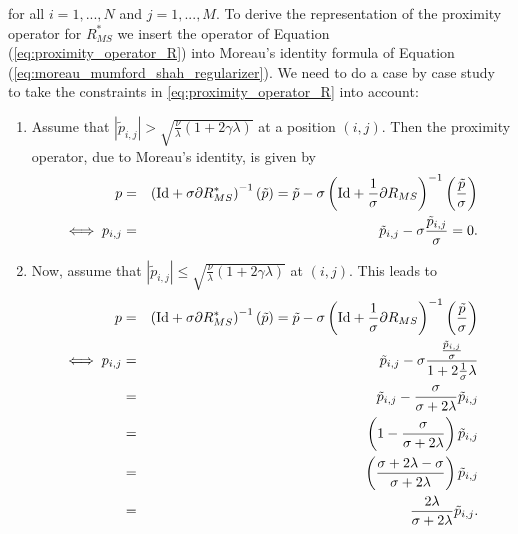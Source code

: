 \documentclass[abstracton]{scrreprt}
\begin{document}
            for all $i = 1, ..., N$ and $j = 1, ..., M$. To derive the representation of the proximity operator for $R_{MS}^{\ast}$ we insert the operator of Equation (\ref{eq:proximity_operator_R}) into Moreau's identity formula of Equation (\ref{eq:moreau_mumford_shah_regularizer}). We need to do a case by case study to take the constraints in \ref{eq:proximity_operator_R} into account:
            \begin{enumerate}
                \item Assume that $|\tilde{p}_{i,j}| > \sqrt{\frac{\nu}{\lambda}(1 + 2\gamma\lambda)}$ at a position $(i,j)$. Then the proximity operator, due to Moreau's identity, is given by
                    \begin{eqnarray}
                        p &=& \left( \textnormal{Id} + \sigma \partial R_{MS}^{\ast} \right)^{-1}(\tilde{p}) = \tilde{p} - \sigma \left( \textnormal{Id} + \frac{1}{\sigma} \partial R_{MS} \right)^{-1} \left(\frac{\tilde{p}}{\sigma} \right) \notag \\
                        \iff p_{i,j} &=& \tilde{p}_{i,j} - \sigma \frac{\tilde{p}_{i,j}}{\sigma} = 0. \notag
                    \end{eqnarray}
                \item Now, assume that $|\tilde{p}_{i,j}| \le \sqrt{\frac{\nu}{\lambda}(1 + 2\gamma\lambda)}$ at $(i,j)$. This leads to
                    \begin{eqnarray}
                        p &=& \left( \textnormal{Id} + \sigma \partial R_{MS}^{\ast} \right)^{-1}(\tilde{p}) = \tilde{p} - \sigma \left( \textnormal{Id} + \frac{1}{\sigma} \partial R_{MS} \right)^{-1} \left(\frac{\tilde{p}}{\sigma} \right) \notag \\
                        \iff p_{i,j} &=& \tilde{p}_{i,j} - \sigma \frac{\frac{\tilde{p}_{i,j}}{\sigma}}{1 + 2\frac{1}{\sigma}\lambda} \notag \\
                        &=& \tilde{p}_{i,j} - \frac{\sigma}{\sigma + 2\lambda}\tilde{p}_{i,j} \notag \\
                        &=& \left(1 - \frac{\sigma}{\sigma + 2\lambda}\right) \tilde{p}_{i,j} \notag \\
                        &=& \left(\frac{\sigma + 2\lambda - \sigma}{\sigma + 2\lambda}\right) \tilde{p}_{i,j} \notag \\
                        &=& \frac{2\lambda}{\sigma + 2\lambda} \tilde{p}_{i,j}. \notag
                    \end{eqnarray}
            \end{enumerate}
\end{document}
